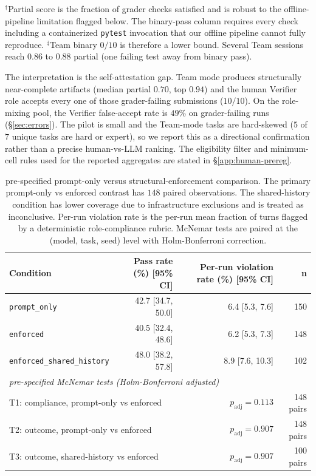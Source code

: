 \documentclass{article}
\begin{document}
\noindent$^{\dagger}$Partial score is the fraction of grader checks satisfied and is robust to the offline-pipeline limitation flagged below. The binary-pass column requires every check including a containerized \texttt{pytest} invocation that our offline pipeline cannot fully reproduce. $^{\ddagger}$Team binary $0/10$ is therefore a lower bound. Several Team sessions reach $0.86$ to $0.88$ partial (one failing test away from binary pass).

The interpretation is the self-attestation gap. Team mode produces structurally near-complete artifacts (median partial $0.70$, top $0.94$) and the human Verifier role accepts every one of those grader-failing submissions ($10 / 10$). On the role-mixing pool, the Verifier false-accept rate is $49\%$ on grader-failing runs (\S\ref{sec:errors}). The pilot is small and the Team-mode tasks are hard-skewed ($5$ of $7$ unique tasks are hard or expert), so we report this as a directional confirmation rather than a precise human-vs-LLM ranking. The eligibility filter and minimum-cell rules used for the reported aggregates are stated in \S\ref{app:human-prereg}.

\begin{table}[t]
\centering
\caption{pre-specified prompt-only versus structural-enforcement comparison. The primary prompt-only vs enforced contrast has $148$ paired observations. The shared-history condition has lower coverage due to infrastructure exclusions and is treated as inconclusive. Per-run violation rate is the per-run mean fraction of turns flagged by a deterministic role-compliance rubric. McNemar tests are paired at the (model, task, seed) level with Holm-Bonferroni correction.}
\label{tab:promptonly}
\small
\setlength{\tabcolsep}{6pt}
\begin{tabular}{lrrr}
\toprule
Condition & Pass rate (\%) [95\% CI] & Per-run violation rate (\%) [95\% CI] & n \\
\midrule
\texttt{prompt\_only}              & 42.7 [34.7, 50.0] & 6.4 [5.3, 7.6]  & 150 \\
\texttt{enforced}                  & 40.5 [32.4, 48.6] & 6.2 [5.3, 7.3]  & 148 \\
\texttt{enforced\_shared\_history} & 48.0 [38.2, 57.8] & 8.9 [7.6, 10.3] & 102 \\
\midrule
\multicolumn{4}{l}{\textit{pre-specified McNemar tests (Holm-Bonferroni adjusted)}} \\
\multicolumn{2}{l}{T1: compliance, prompt-only vs enforced} & $p_{\text{adj}}=0.113$ & 148 pairs \\
\multicolumn{2}{l}{T2: outcome, prompt-only vs enforced} & $p_{\text{adj}}=0.907$ & 148 pairs \\
\multicolumn{2}{l}{T3: outcome, shared-history vs enforced} & $p_{\text{adj}}=0.907$ & 100 pairs \\
\bottomrule
\end{tabular}
\end{table}
\end{document}
